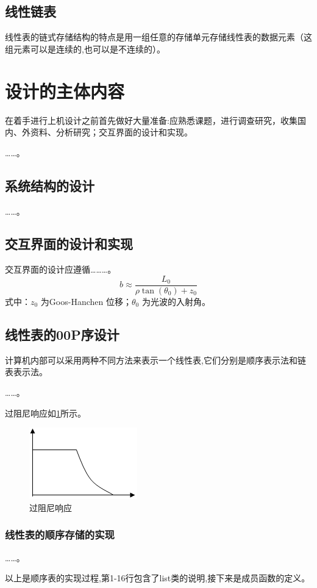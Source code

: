 \documentclass{upcthesis}
\begin{document}
\subsection{线性链表}
	线性表的链式存储结构的特点是用一组任意的存储单元存储线性表的数据元素（这组元素可以是连续的,也可以是不连续的）。

\section{设计的主体内容}
在着手进行上机设计之前首先做好大量准备:应熟悉课题，进行调查研究，收集国内、外资料、分析研究；交互界面的设计和实现。

……。
\subsection{系统结构的设计}
	……。
\subsection{交互界面的设计和实现}
	交互界面的设计应遵循………。
	\begin{equation}
		b \approx \frac{L_0}{\rho\tan(\theta_0) + z_0}
	\end{equation}
式中：$z_0$ 为Goos-Hanchen 位移；$\theta_0$ 为光波的入射角。
\subsection{线性表的00P序设计}
	计算机内部可以采用两种不同方法来表示一个线性表,它们分别是顺序表示法和链表表示法。
	
	……。
	
	过阻尼响应如\ref{fig:fig1}所示。
	\begin{figure}
		\centering
		\includegraphics{./fig1.png}
		\caption{过阻尼响应}
		\label{fig:fig1}
	\end{figure}

\subsubsection{线性表的顺序存储的实现}
……。

以上是顺序表的实现过程,第1-16行包含了list类的说明,接下来是成员函数的定义。
\end{document}

